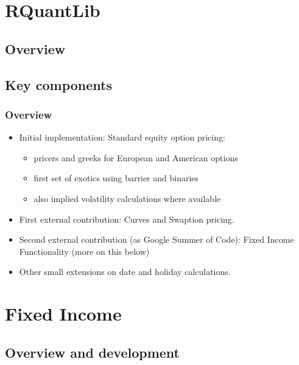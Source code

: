 \documentclass[compress]{beamer}
\begin{document}
\section{RQuantLib}
\subsection{Overview}
\subsection{Key components}
\begin{frame}
  \frametitle{Overview}
  \begin{itemize}
  \item Initial implementation: Standard equity option pricing:
    \begin{itemize}
      \item pricers and greeks for European and American options
      \item first set of exotics using barrier and binaries
      \item also implied volatility calculations where available
    \end{itemize}
  \item First external contribution: Curves and Swaption pricing.
  \item Second external contribution (as Google Summer of Code): Fixed Income
    Functionality (more on this below)
  \item Other small extensions on date and holiday calculations.
  \end{itemize}
\end{frame}


\section{Fixed Income}
\subsection{Overview and development}
\end{document}
